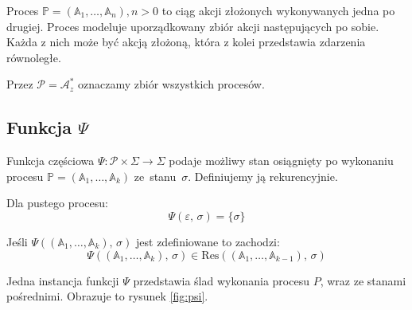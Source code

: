 \documentclass[11pt,a4paper]{article}
\theoremstyle{definition}
\begin{document}
Proces $\mathbb{P} = (\mathbb{A}_1, \ldots, \mathbb{A}_n), n > 0$ to ciąg akcji złożonych
wykonywanych jedna po drugiej. Proces modeluje uporządkowany zbiór akcji następujących po sobie. Każda z nich może być akcją złożoną, która z kolei przedstawia zdarzenia równoległe.

Przez $\mathcal{P} = \mathcal{A}_z^*$ oznaczamy zbiór wszystkich procesów.

\subsection{Funkcja \texorpdfstring{$\Psi$}{Psi}}

Funkcja częściowa $\Psi : \mathcal{P} \times \Sigma \rightarrow \Sigma$ podaje możliwy stan osiągnięty po wykonaniu procesu $\mathbb{P} = (\mathbb{A}_1,\ldots,\mathbb{A}_k)$ ze~stanu~$\sigma$. Definiujemy ją rekurencyjnie.

Dla pustego procesu:
$$
  \Psi(\varepsilon,\,\sigma) = \{\sigma\}
$$

Jeśli $\Psi((\mathbb{A}_1,\ldots,\mathbb{A}_k),\,\sigma)$ jest zdefiniowane to zachodzi:
$$
  \Psi((\mathbb{A}_1,\ldots,\mathbb{A}_k),\,\sigma) 
  \in 
  \mathrm{Res}((\mathbb{A}_1,\ldots,\mathbb{A}_{k-1}),\,\sigma)
$$

Jedna instancja funkcji $\Psi$ przedstawia ślad wykonania procesu $P$, wraz ze stanami pośrednimi. Obrazuje to rysunek \ref{fig:psi}.
\end{document}
